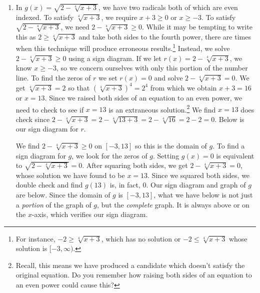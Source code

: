 \documentclass[12pt]{ximera}
\begin{document}
\begin{example}
\begin{enumerate}
\item In $g(x) = \sqrt{2-\sqrt[4]{x+3}}$, we have two radicals both of which are even indexed.  To satisfy $\sqrt[4]{x+3}$, we require $x+3 \geq 0$ or $x \geq -3$.  To satisfy $ \sqrt{2-\sqrt[4]{x+3}}$, we need $2-\sqrt[4]{x+3} \geq 0$.  While it may be tempting to write this as $2 \geq \sqrt[4]{x+3}$ and take both sides to the fourth power, there are times when this technique will produce erroneous results.\footnote{For instance, $-2 \geq \sqrt[4]{x+3}$, which has no solution or  $-2 \leq \sqrt[4]{x+3}$ whose solution is $[-3,\infty)$.}  Instead, we solve $2-\sqrt[4]{x+3} \geq 0$ using a sign diagram.  If we let $r(x) = 2-\sqrt[4]{x+3}$, we know $x \geq -3$, so we  concern ourselves with only this portion of the number line.  To find the zeros of $r$ we set $r(x) =0$ and solve  $2-\sqrt[4]{x+3}=0$.  We get $\sqrt[4]{x+3} = 2$ so that $\left(\sqrt[4]{x+3}\right)^4 = 2^4$ from which we obtain $x+3 = 16$ or $x=13$.  Since we raised both sides of an equation to an even power, we need to check to see if $x=13$ is an extraneous solution.\footnote{Recall, this means we have produced a candidate which doesn't satisfy the original equation.  Do you remember how raising both sides of an equation to an even power could cause this?}  We find $x=13$ does check since $2-\sqrt[4]{x+3} = 2 - \sqrt[4]{13+3} = 2 - \sqrt[4]{16} = 2 - 2 = 0$. Below is our sign diagram for $r$.



\begin{center}











\end{center}

We find $2-\sqrt[4]{x+3} \geq 0$ on $[-3,13]$ so this is the domain of $g$.  To find a sign diagram for $g$, we look for the zeros of $g$.  Setting $g(x) = 0$ is equivalent to $\sqrt{2-\sqrt[4]{x+3}}=0$.  After squaring both sides, we get $2-\sqrt[4]{x+3} = 0$, whose solution we have found to be $x=13$.   Since we squared both sides, we double check and find $g(13)$ is, in fact, $0$. Our sign diagram and graph of $g$ are below.  Since the domain of $g$ is $[-3,13]$, what we have below is not just a \textit{portion} of the graph of $g$, but the \textit{complete} graph.  It is always above or on the $x$-axis, which verifies our sign diagram.


\end{enumerate}
\end{example}
\end{document}
